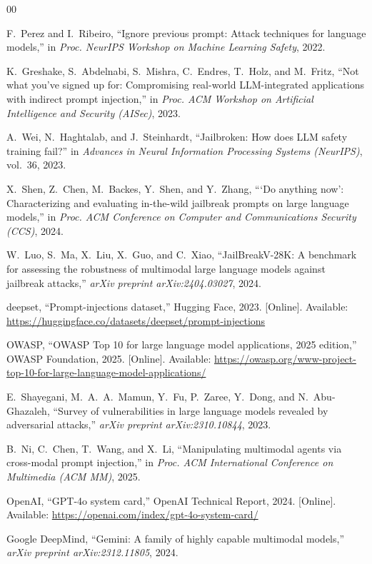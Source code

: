 \documentclass[conference]{IEEEtran}
\begin{document}
\begin{thebibliography}{00}

F.~Perez and I.~Ribeiro, ``Ignore previous prompt: Attack techniques for
language models,'' in \textit{Proc. NeurIPS Workshop on Machine Learning Safety},
2022.

K.~Greshake, S.~Abdelnabi, S.~Mishra, C.~Endres, T.~Holz, and
M.~Fritz, ``Not what you've signed up for: Compromising real-world
LLM-integrated applications with indirect prompt injection,'' in
\textit{Proc. ACM Workshop on Artificial Intelligence and Security (AISec)}, 2023.

A.~Wei, N.~Haghtalab, and J.~Steinhardt, ``Jailbroken: How does LLM safety
training fail?'' in \textit{Advances in Neural Information Processing Systems
(NeurIPS)}, vol.~36, 2023.

X.~Shen, Z.~Chen, M.~Backes, Y.~Shen, and Y.~Zhang, ```Do anything now':
Characterizing and evaluating in-the-wild jailbreak prompts on large language
models,'' in \textit{Proc. ACM Conference on Computer and Communications
Security (CCS)}, 2024.

W.~Luo, S.~Ma, X.~Liu, X.~Guo, and C.~Xiao, ``JailBreakV-28K: A benchmark
for assessing the robustness of multimodal large language models against jailbreak
attacks,'' \textit{arXiv preprint arXiv:2404.03027}, 2024.

deepset, ``Prompt-injections dataset,'' Hugging Face, 2023. [Online].
Available: \url{https://huggingface.co/datasets/deepset/prompt-injections}

OWASP, ``OWASP Top 10 for large language model applications, 2025 edition,''
OWASP Foundation, 2025. [Online]. Available:
\url{https://owasp.org/www-project-top-10-for-large-language-model-applications/}

E.~Shayegani, M.~A.~A.~Mamun, Y.~Fu, P.~Zaree, Y.~Dong, and N.~Abu-Ghazaleh,
``Survey of vulnerabilities in large language models revealed by adversarial
attacks,'' \textit{arXiv preprint arXiv:2310.10844}, 2023.

B.~Ni, C.~Chen, T.~Wang, and X.~Li, ``Manipulating multimodal agents via
cross-modal prompt injection,'' in \textit{Proc. ACM International Conference
on Multimedia (ACM MM)}, 2025.

OpenAI, ``GPT-4o system card,'' OpenAI Technical Report, 2024. [Online].
Available: \url{https://openai.com/index/gpt-4o-system-card/}

Google DeepMind, ``Gemini: A family of highly capable multimodal models,''
\textit{arXiv preprint arXiv:2312.11805}, 2024.

\end{thebibliography}
\end{document}
